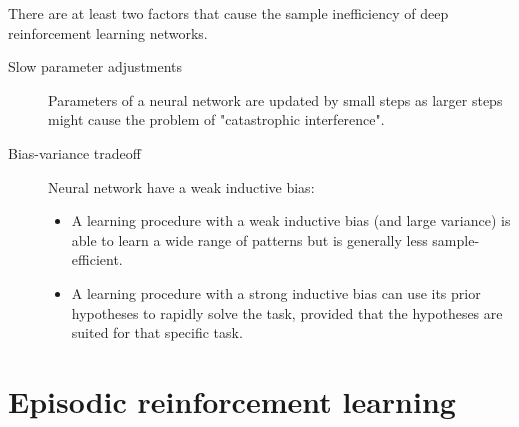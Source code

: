 There are at least two factors that cause the sample inefficiency of deep reinforcement learning networks.
\begin{description}
    \item[Slow parameter adjustments] 
        Parameters of a neural network are updated by small steps as larger steps might cause the problem of "catastrophic interference".

    \item[Bias-variance tradeoff] 
        Neural network have a weak inductive bias:
        \begin{itemize}
            \item A learning procedure with a weak inductive bias (and large variance) is able to learn a wide range of patterns but is generally less sample-efficient.
            \item A learning procedure with a strong inductive bias can use its prior hypotheses to rapidly solve the task, provided that the hypotheses are suited for that specific task.
        \end{itemize}
\end{description}


\section{Episodic reinforcement learning}

